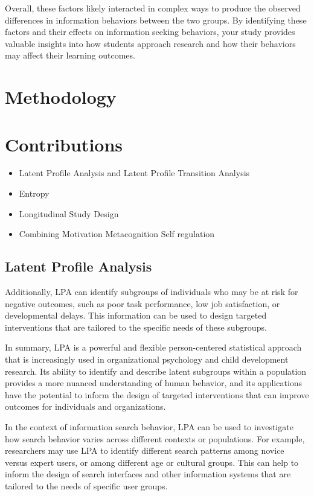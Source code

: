 \documentclass[letterpaper, nobind]{templates/ociamthesis}
\providecommand{\tightlist}{%
  \setlength{\itemsep}{0pt}\setlength{\parskip}{0pt}}
\begin{document}
Overall, these factors likely interacted in complex ways to produce the observed differences in information behaviors between the two groups. By identifying these factors and their effects on information seeking behaviors, your study provides valuable insights into how students approach research and how their behaviors may affect their learning outcomes.

\hypertarget{methodology}{%
\section{Methodology}\label{methodology}}

\hypertarget{contributions}{%
\section{Contributions}\label{contributions}}

\begin{itemize}
\tightlist
\item
  Latent Profile Analysis and Latent Profile Transition Analysis
\item
  Entropy
\item
  Longitudinal Study Design
\item
  Combining Motivation Metacognition Self regulation
\end{itemize}

\hypertarget{latent-profile-analysis}{%
\subsection{Latent Profile Analysis}\label{latent-profile-analysis}}

Additionally, LPA can identify subgroups of individuals who may be at risk for negative outcomes, such as poor task performance, low job satisfaction, or developmental delays. This information can be used to design targeted interventions that are tailored to the specific needs of these subgroups.

In summary, LPA is a powerful and flexible person-centered statistical approach that is increasingly used in organizational psychology and child development research. Its ability to identify and describe latent subgroups within a population provides a more nuanced understanding of human behavior, and its applications have the potential to inform the design of targeted interventions that can improve outcomes for individuals and organizations.

In the context of information search behavior, LPA can be used to investigate how search behavior varies across different contexts or populations. For example, researchers may use LPA to identify different search patterns among novice versus expert users, or among different age or cultural groups. This can help to inform the design of search interfaces and other information systems that are tailored to the needs of specific user groups.
\end{document}
